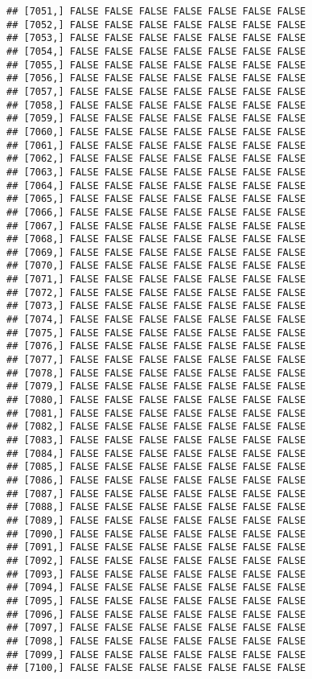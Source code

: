 \documentclass[
]{article}
\begin{document}
\begin{verbatim}
## [7051,] FALSE FALSE FALSE FALSE FALSE FALSE FALSE
## [7052,] FALSE FALSE FALSE FALSE FALSE FALSE FALSE
## [7053,] FALSE FALSE FALSE FALSE FALSE FALSE FALSE
## [7054,] FALSE FALSE FALSE FALSE FALSE FALSE FALSE
## [7055,] FALSE FALSE FALSE FALSE FALSE FALSE FALSE
## [7056,] FALSE FALSE FALSE FALSE FALSE FALSE FALSE
## [7057,] FALSE FALSE FALSE FALSE FALSE FALSE FALSE
## [7058,] FALSE FALSE FALSE FALSE FALSE FALSE FALSE
## [7059,] FALSE FALSE FALSE FALSE FALSE FALSE FALSE
## [7060,] FALSE FALSE FALSE FALSE FALSE FALSE FALSE
## [7061,] FALSE FALSE FALSE FALSE FALSE FALSE FALSE
## [7062,] FALSE FALSE FALSE FALSE FALSE FALSE FALSE
## [7063,] FALSE FALSE FALSE FALSE FALSE FALSE FALSE
## [7064,] FALSE FALSE FALSE FALSE FALSE FALSE FALSE
## [7065,] FALSE FALSE FALSE FALSE FALSE FALSE FALSE
## [7066,] FALSE FALSE FALSE FALSE FALSE FALSE FALSE
## [7067,] FALSE FALSE FALSE FALSE FALSE FALSE FALSE
## [7068,] FALSE FALSE FALSE FALSE FALSE FALSE FALSE
## [7069,] FALSE FALSE FALSE FALSE FALSE FALSE FALSE
## [7070,] FALSE FALSE FALSE FALSE FALSE FALSE FALSE
## [7071,] FALSE FALSE FALSE FALSE FALSE FALSE FALSE
## [7072,] FALSE FALSE FALSE FALSE FALSE FALSE FALSE
## [7073,] FALSE FALSE FALSE FALSE FALSE FALSE FALSE
## [7074,] FALSE FALSE FALSE FALSE FALSE FALSE FALSE
## [7075,] FALSE FALSE FALSE FALSE FALSE FALSE FALSE
## [7076,] FALSE FALSE FALSE FALSE FALSE FALSE FALSE
## [7077,] FALSE FALSE FALSE FALSE FALSE FALSE FALSE
## [7078,] FALSE FALSE FALSE FALSE FALSE FALSE FALSE
## [7079,] FALSE FALSE FALSE FALSE FALSE FALSE FALSE
## [7080,] FALSE FALSE FALSE FALSE FALSE FALSE FALSE
## [7081,] FALSE FALSE FALSE FALSE FALSE FALSE FALSE
## [7082,] FALSE FALSE FALSE FALSE FALSE FALSE FALSE
## [7083,] FALSE FALSE FALSE FALSE FALSE FALSE FALSE
## [7084,] FALSE FALSE FALSE FALSE FALSE FALSE FALSE
## [7085,] FALSE FALSE FALSE FALSE FALSE FALSE FALSE
## [7086,] FALSE FALSE FALSE FALSE FALSE FALSE FALSE
## [7087,] FALSE FALSE FALSE FALSE FALSE FALSE FALSE
## [7088,] FALSE FALSE FALSE FALSE FALSE FALSE FALSE
## [7089,] FALSE FALSE FALSE FALSE FALSE FALSE FALSE
## [7090,] FALSE FALSE FALSE FALSE FALSE FALSE FALSE
## [7091,] FALSE FALSE FALSE FALSE FALSE FALSE FALSE
## [7092,] FALSE FALSE FALSE FALSE FALSE FALSE FALSE
## [7093,] FALSE FALSE FALSE FALSE FALSE FALSE FALSE
## [7094,] FALSE FALSE FALSE FALSE FALSE FALSE FALSE
## [7095,] FALSE FALSE FALSE FALSE FALSE FALSE FALSE
## [7096,] FALSE FALSE FALSE FALSE FALSE FALSE FALSE
## [7097,] FALSE FALSE FALSE FALSE FALSE FALSE FALSE
## [7098,] FALSE FALSE FALSE FALSE FALSE FALSE FALSE
## [7099,] FALSE FALSE FALSE FALSE FALSE FALSE FALSE
## [7100,] FALSE FALSE FALSE FALSE FALSE FALSE FALSE

\end{verbatim}
\end{document}
